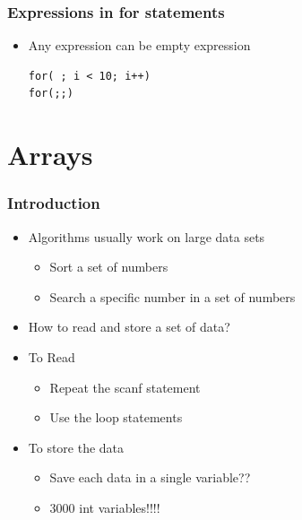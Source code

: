 \documentclass{../c-lecture}
\begin{document}
\begin{frame}[fragile]
  \frametitle{Expressions in for statements}
  \begin{itemize}
    \item Any expression can be empty expression
    \begin{verbatim}
for( ; i < 10; i++)
for(;;)
    \end{verbatim}
  \end{itemize}
\end{frame}

\section{Arrays}

\begin{frame}
  \frametitle{Introduction}
  \begin{itemize}
    \item Algorithms usually work on large data sets
    \begin{itemize}
      \item Sort a set of numbers
      \item Search a specific number in a set of numbers
    \end{itemize}
    \item How to read and store a set of data?
    \item To Read
    \begin{itemize}
      \item Repeat the scanf statement
      \item Use the loop statements
    \end{itemize}
    \item To store the data
    \begin{itemize}
      \item Save each data in a single variable??
      \item 3000 int variables!!!!
    \end{itemize}
  \end{itemize}
\end{frame}
\end{document}

